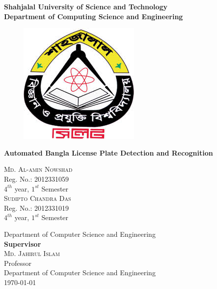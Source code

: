 {\huge \bf Shahjalal University of Science and Technology}\\
{\LARGE \bf Department of Computing Science and Engineering}

\vfill
\begin{figure}[h]
\centering
\includegraphics[scale=0.6]{./img/varsityLogo}
\end{figure}


\vfill 
{\LARGE \bf Automated Bangla License Plate Detection and Recognition}\\      
\begin{multicols}{2}
\textsc{\Large Md. Al-amin Nowshad}\\
Reg. No.: 2012331059\\ $4^{th}$ year, $1^{st}$ Semester\\
\textsc{\Large Sudipto Chandra Das} \\
Reg. No.: 2012331019\\ $4^{th}$ year, $1^{st}$ Semester
\end{multicols}

\vfill
Department of Computer Science and Engineering\\

\vfill
{\bf Supervisor}\\
\textsc{\Large Md. Jahirul Islam} \\
Professor\\ 
Department of Computer Science and Engineering\\

\vfill
\today